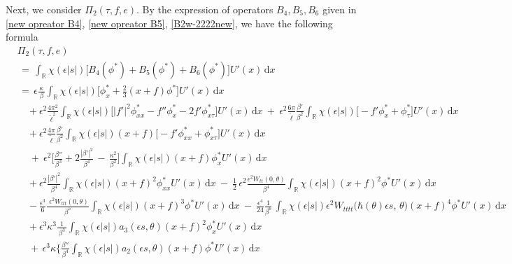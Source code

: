 \documentclass[10pt, reqno]{amsart}
\numberwithin{equation}{section}
\theoremstyle{definition}
\begin{document}
{ Next, we consider $\Pi_2(\tau, f, e)$.
 By the expression of operators $B_4, B_5, B_6$ given in \eqref{new opreator B4}, \eqref{new opreator B5}, \eqref{B2w-2222new},
 we have the following formula
\begin{align*}
&\Pi_2(\tau, f, e)
\nonumber\\[2mm]
&\,=\, \int_{{\mathbb R}} \chi(\epsilon|s|) \big[B_4(\phi^*)+ B_5(\phi^*)+ B_6(\phi^*)\big] U'(x)\,{\mathrm d}x
\nonumber\\[2mm]
&\,=\,\epsilon \frac{\kappa}{\, \beta\, }\int_{\mathbb R} \chi(\epsilon|s|)\Big[ \phi^*_x +\frac{2}{3} (x+f)\phi^*\Big] U'(x)\,{\mathrm d}x
\nonumber\\[2mm]
&\quad
+ \epsilon^2\frac{4\pi^2}{{\tilde\ell}^2}\int_{\mathbb R} \chi(\epsilon|s|)\Big[|f'|^2 \phi^*_{xx} -f''\phi^*_x -2f' \phi^*_{x\tau}\Big]U'(x)\,{\mathrm d}x
\ +\
\epsilon^2\frac{6\pi}{{\tilde\ell}}\frac{\beta'} {\beta^2} \int_{\mathbb R} \chi(\epsilon|s|)\Big[- f' \phi^*_x +\phi^*_\tau\Big]U'(x)\,{\mathrm d}x
\nonumber\\[2mm]
&\quad
+ \epsilon^2 \frac{4\pi}{{\tilde\ell}} \frac{\beta'}{\beta^2} \int_{\mathbb R} \chi(\epsilon|s|)(x+f)\big[- f' \phi^*_{xx} +\phi^*_{x\tau}\big]U'(x)\,{\mathrm d}x
\nonumber\\[2mm]
&\quad\ +\
\epsilon^2\Big[\frac{\beta''}{\beta^3} +2\frac{|\beta'|^2}{\beta^4}\,-\,\frac{\kappa^2}{\beta^2} \Big]
\int_{\mathbb R} \chi(\epsilon|s|)(x+f) \phi^*_{x} U'(x)\,{\mathrm d}x
\nonumber\\[2mm]
&\quad
+ \epsilon^2 \frac{|\beta'|^2}{\beta^4} \int_{\mathbb R} \chi(\epsilon|s|)(x+f)^2 \phi^*_{xx} U'(x)\,{\mathrm d}x
\ -\
\frac{1}{2}\, \epsilon^2\frac{\epsilon^2W_{tt}(0, \theta)}{\beta^4} \int_{\mathbb R} \chi(\epsilon|s|)(x+f)^2 \phi^* U'(x)\,{\mathrm d}x
\nonumber\\[2mm]
&\quad
- \frac{\epsilon^3}{6} \frac{\, \, \epsilon^2 W_{ttt}(0, \theta)}{\beta^5} \int_{\mathbb R} \chi(\epsilon|s|)(x+f)^3 \phi^*U'(x)\,{\mathrm d}x
\ -\
\frac{\epsilon^4}{24} \frac{1}{\beta^6}\, \int_{\mathbb R} \chi(\epsilon|s|) \epsilon^2 W_{tttt}\big(\hbar(\theta)\epsilon s, \, \theta\big)(x+f)^4\phi^* U'(x)\,{\mathrm d}x
\nonumber\\[2mm]
&\quad
 +\epsilon^3 \kappa^3  \frac{1}{\, \beta^3\, }\int_{\mathbb R} \chi(\epsilon|s|)a_3(\epsilon s, \theta)(x+f)^2\phi^*_{x} U'(x)\,{\mathrm d}x
\nonumber\\[2mm]
&\quad
\,+\,
\epsilon^3 \kappa
\Bigg\{
\frac{\beta''} {\beta^4} \int_{\mathbb R} \chi(\epsilon|s|)a_2(\epsilon s, \theta)(x+f) \phi^*U'(x)\,{\mathrm d}x

\end{align*}}
\end{document}
